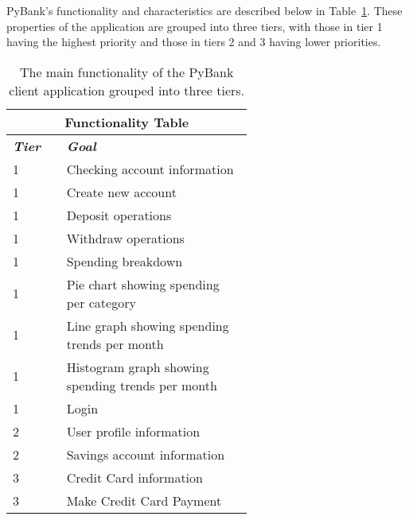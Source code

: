 PyBank's functionality and characteristics are described below in Table~\ref{fig:functionality_table}. These properties of the application are grouped into three tiers, with those in tier 1 having the highest priority and those in tiers 2 and 3 having lower priorities.

\begin{table}[H]
    \begin{center}
        \begin{tabular}{ |p{0.10\linewidth}|p{0.50\linewidth}|  }
         \hline
         \multicolumn{2}{|c|}{\textbf{Functionality Table}} \\
         \hline
         \textbf{\emph{Tier}} & \textbf{\emph{Goal}} \\
         \hline
         \textcolor{Mahogany}{1} & \textcolor{Mahogany}{Checking account information} \\
         \hline
         \textcolor{Mahogany}{1} & \textcolor{Mahogany}{Create new account} \\
         \hline
         \textcolor{Mahogany}{1} & \textcolor{Mahogany}{Deposit operations} \\
         \hline
         \textcolor{Mahogany}{1} & \textcolor{Mahogany}{Withdraw operations} \\
         \hline
         \textcolor{Mahogany}{1} & \textcolor{Mahogany}{Spending breakdown} \\
         \hline
         \textcolor{Mahogany}{1} & \textcolor{Mahogany}{Pie chart showing spending per category} \\
         \hline
         \textcolor{Mahogany}{1} & \textcolor{Mahogany}{Line graph showing spending trends per month} \\
         \hline
         \textcolor{Mahogany}{1} & \textcolor{Mahogany}{Histogram graph showing spending trends per month} \\
         \hline
         \textcolor{Mahogany}{1} & \textcolor{Mahogany}{Login} \\
         \hline
         \textcolor{NavyBlue}{2} & \textcolor{NavyBlue}{User profile information} \\
         \hline
         \textcolor{NavyBlue}{2} & \textcolor{NavyBlue}{Savings account information} \\
         \hline
         \textcolor{OliveGreen}{3} & \textcolor{OliveGreen}{Credit Card information} \\
         \hline
         \textcolor{OliveGreen}{3} & \textcolor{OliveGreen}{Make Credit Card Payment} \\
         \hline
        \end{tabular}
        \caption{The main functionality of the PyBank client application grouped into three tiers.}
    	\label{fig:functionality_table}
    \end{center}
\end{table}

